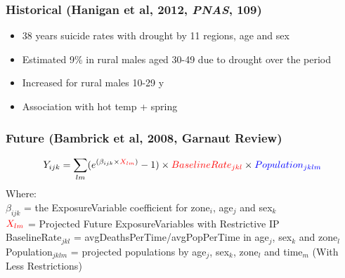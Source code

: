 \documentclass[bigger]{beamer}
\begin{document}
\begin{frame}
\frametitle{Historical (Hanigan et al, 2012, \emph{PNAS}, 109)}
\label{sec-2-2}

\begin{itemize}
\item 38 years suicide rates with drought by 11 regions, age and sex
\item Estimated 9\% in rural males aged 30-49 due to drought over the period
\item Increased for rural males 10-29 y
\item Association with hot temp + spring
\end{itemize}
\end{frame}
\begin{frame}
\frametitle{Future (Bambrick et al, 2008, Garnaut Review)}
\label{sec-2-3}

\begin{footnotesize}
$$Y_{ijk}=\sum_{lm}(e^{(\beta_{ijk} \times {\color{red} X_{lm}})} - 1) \times {\color{red}BaselineRate_{jkl}} \times {\color{blue} Population_{jklm}}$$
\noindent Where:\\
$\beta_{ijk}$ = the ExposureVariable coefficient for zone$_i$, age$_j$ and sex$_{k}$ \\
${\color{red}X_{lm}}$ = Projected Future ExposureVariables {\color{red} with Restrictive IP} \\
{\color{red}BaselineRate$_{jkl}$} = {\color{red}avgDeathsPerTime}/{\color{blue}avgPopPerTime} in age$_j$, sex$_k$ and zone$_l$ \\
{\color{blue}Population$_{jklm}$} = projected populations by age$_j$, sex$_k$, zone$_l$ and time$_m$ {\color{blue} (With Less Restrictions)}\\

\end{footnotesize}
\end{frame}
\end{document}
